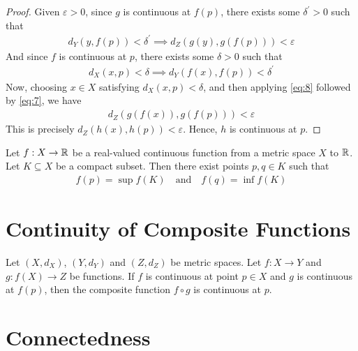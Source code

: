 \documentclass[thmcnt=section, 12pt]{my-elegantbook}
\begin{document}
\begin{proof}
    Given $\varepsilon > 0$, since $g$ is continuous at $f(p)$, there exists some $\delta^\prime > 0$ such that
    \begin{align}
        d_Y(y, f(p)) < \delta^\prime
        \implies d_Z(g(y), g(f(p))) < \varepsilon
        \label{eq:7}
    \end{align}
    And since $f$ is continuous at $p$, there exists some $\delta > 0$ such that
    \begin{align}
        d_X(x, p) < \delta
        \implies d_Y(f(x), f(p)) < \delta^\prime
        \label{eq:8}
    \end{align}
    Now, choosing $x \in X$ satisfying $d_X(x, p) < \delta$, and then applying \eqref{eq:8} followed by \eqref{eq:7}, we have
    \begin{align*}
        d_Z(g(f(x)), g(f(p))) < \varepsilon
    \end{align*}
    This is precisely $d_Z(h(x), h(p)) < \varepsilon$. Hence, $h$ is continuous at $p$.
\end{proof}


\begin{theorem} \label{thm:6}
    Let $f: X \to \mathbb{R}$ be a real-valued continuous function from a metric space $X$ to $\mathbb{R}$. Let $K \subseteq X$ be a compact subset. Then there exist points $p, q \in K$ such that
    \begin{align*}
        f(p) = \sup f(K)
        \quad \text{and} \quad
        f(q) = \inf f(K)
    \end{align*}
\end{theorem}


\section{Continuity of Composite Functions}

\begin{theorem} \label{thm:41}
    Let $(X, d_X)$, $(Y, d_Y)$ and $(Z, d_Z)$ be metric spaces. Let $f: X \to Y$ and $g: f(X) \to Z$ be functions. If $f$ is continuous at point $p \in X$ and $g$ is continuous at $f(p)$, then the composite function $f \circ g$ is continuous at $p$.
\end{theorem}


\section{Connectedness}
\end{document}
